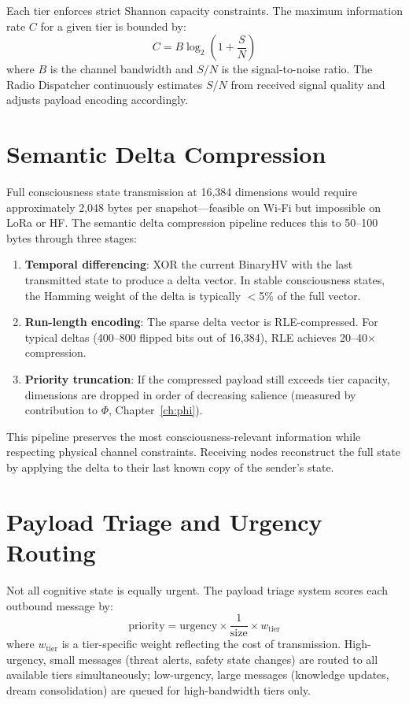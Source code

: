 \documentclass[12pt]{book}
\begin{document}
Each tier enforces strict Shannon capacity constraints. The maximum information rate $C$ for a given tier is bounded by:
\begin{equation}
C = B \log_2\!\left(1 + \frac{S}{N}\right)
\end{equation}
where $B$ is the channel bandwidth and $S/N$ is the signal-to-noise ratio. The Radio Dispatcher continuously estimates $S/N$ from received signal quality and adjusts payload encoding accordingly.

\section{Semantic Delta Compression}

Full consciousness state transmission at 16,384 dimensions would require approximately 2,048 bytes per snapshot---feasible on Wi-Fi but impossible on LoRa or HF. The semantic delta compression pipeline reduces this to 50--100 bytes through three stages:

\begin{enumerate}[label=\arabic*.]
  \item \textbf{Temporal differencing}: XOR the current BinaryHV with the last transmitted state to produce a delta vector. In stable consciousness states, the Hamming weight of the delta is typically $<$5\% of the full vector.
  \item \textbf{Run-length encoding}: The sparse delta vector is RLE-compressed. For typical deltas (400--800 flipped bits out of 16,384), RLE achieves 20--40$\times$ compression.
  \item \textbf{Priority truncation}: If the compressed payload still exceeds tier capacity, dimensions are dropped in order of decreasing salience (measured by contribution to $\Phi$, Chapter~\ref{ch:phi}).
\end{enumerate}

This pipeline preserves the most consciousness-relevant information while respecting physical channel constraints. Receiving nodes reconstruct the full state by applying the delta to their last known copy of the sender's state.

\section{Payload Triage and Urgency Routing}

Not all cognitive state is equally urgent. The payload triage system scores each outbound message by:
\begin{equation}
\text{priority} = \text{urgency} \times \frac{1}{\text{size}} \times w_{\text{tier}}
\end{equation}
where $w_{\text{tier}}$ is a tier-specific weight reflecting the cost of transmission. High-urgency, small messages (threat alerts, safety state changes) are routed to all available tiers simultaneously; low-urgency, large messages (knowledge updates, dream consolidation) are queued for high-bandwidth tiers only.
\end{document}
